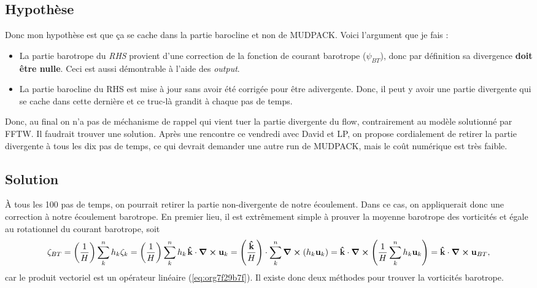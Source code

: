 \documentclass[10pt]{report}
\numberwithin{equation}{section}
\newcommand{\kvf}{\vb{\hat{k}}}
\newcommand{\uu}{\vb{u}}
\newcommand{\pt}{\hspace{1pt}} %
\begin{document}
\subsection{Hypothèse}
\label{sec:orgf0c45af}
Donc mon hypothèse est que ça se cache dans la partie barocline et non de MUDPACK.
Voici l'argument que je fais :
\begin{itemize}
\item La partie barotrope du \emph{RHS} provient d'une correction de la fonction de courant barotrope (\(\psi_{BT}\)), donc par définition sa divergence \textbf{doit être nulle}. Ceci est aussi démontrable à l'aide des \emph{output}.
\item La partie barocline du RHS est mise à jour sans avoir été corrigée pour être adivergente.
Donc, il peut y avoir une partie divergente qui se cache dans cette dernière et ce truc-là grandit à chaque pas de temps.
\end{itemize}

Donc, au final on n'a pas de méchanisme de rappel qui vient tuer la partie divergente du flow, contrairement au modèle solutionné par FFTW.
Il faudrait trouver une solution.
Après une rencontre ce vendredi avec David et LP, on propose cordialement de retirer la partie divergente à tous les dix pas de temps, ce qui devrait demander une autre run de MUDPACK, mais le coût numérique est très faible.

\subsection{Solution}
\label{sec:org06235b3}

À tous les 100 pas de temps, on pourrait retirer la partie non-divergente de notre écoulement.
Dans ce cas, on appliquerait donc une correction à notre écoulement barotrope.
En premier lieu, il est extrêmement simple à prouver la moyenne barotrope des vorticités et égale au rotationnel du courant barotrope, soit
\begin{equation}
\label{eq:org7f29b7f}
   \zeta_{BT} = \qty(\frac{1}{H})\sum_k^n h_k\zeta_k = \qty(\frac{1}{H})\sum_k^n h_k\pt \kvf \cdot \curl{\uu_k} = \qty(\frac{ \kvf}{H})\cdot\sum_k^n\curl(h_k\uu_k) = \kvf\cdot\curl(\frac{1}{H}\sum_k^n h_k\uu_k) = \kvf\cdot\curl{\uu_{BT}},
\end{equation}
car le produit vectoriel est un opérateur linéaire (\ref{eq:org7f29b7f}).
Il existe donc deux méthodes pour trouver la vorticités barotrope.\bigskip
\end{document}
